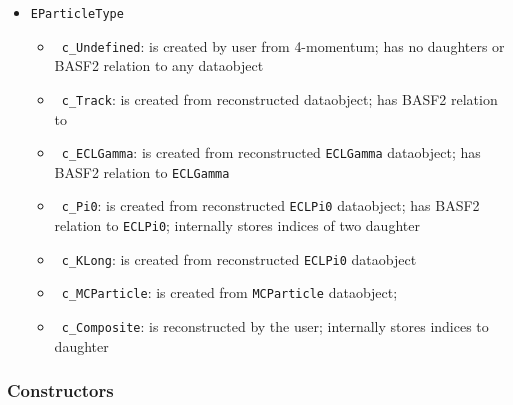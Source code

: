 \begin{itemize}
 \item {\color{blue}\tt EParticleType}
 \begin{itemize}
  \item {\tt\color{red} c\_Undefined}: \particle is created by user from 4-momentum; has no daughters or BASF2 relation to any \mdst dataobject
  \item {\tt\color{red} c\_Track}: \particle is created from reconstructed \track \mdst dataobject; has BASF2 relation to \track
  \item {\tt\color{red} c\_ECLGamma}: \particle is created from reconstructed {\tt ECLGamma} \mdst dataobject; has BASF2 relation to {\tt ECLGamma}
  \item {\tt\color{red} c\_Pi0}: \particle is created from reconstructed {\tt ECLPi0} \mdst dataobject; has BASF2 relation to {\tt ECLPi0}; internally stores indices of two daughter \particle
  \item {\tt\color{red} c\_KLong}: \particle is created from reconstructed {\tt ECLPi0} \mdst dataobject
  \item {\tt\color{red} c\_MCParticle}: \particle is created from {\tt MCParticle} \mdst dataobject;
  \item {\tt\color{red} c\_Composite}: \particle is reconstructed by the user; internally stores indices to daughter \particle
 \end{itemize}
\end{itemize}

\subsubsection{Constructors}

